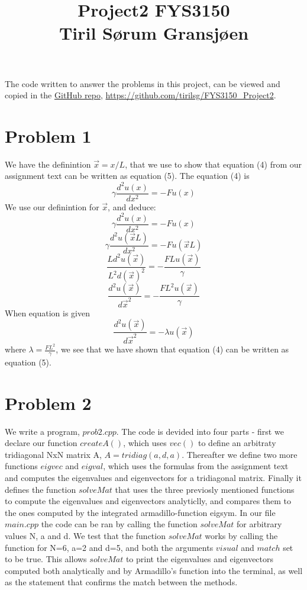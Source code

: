 \documentclass{article} %
\begin{document}
\title{Project2 FYS3150 \\ Tiril Sørum Gransjøen} %
\maketitle
   The code written to answer the problems in this project, 
  can be viewed and copied in the \href{https://github.com/tirilsg/FYS3150_Project2}{GitHub repo}, 
  \url{https://github.com/tirilsg/FYS3150_Project2}. 

  \section{Problem 1} 
  We have the definintion $ \vec{x}=x/L $, that we use to show that equation (4) 
  from our assignment text can be written as equation (5). The equation (4) is 
  \begin{equation}
    \gamma \frac{d^2u(x)}{dx^2}=-Fu(x)\tag{4} 
  \end{equation}
  We use our definintion for $ \vec{x}$, and deduce:
  $$\gamma \frac{d^2u(x)}{dx^2}=-Fu(x) $$ 
  $$\gamma \frac{d^2u(\vec{x}L)}{dx^2}=-Fu(\vec{x}L) $$ 
  $$\frac{Ld^2u(\vec{x})}{L^2 d(\vec{x})^2}=-\frac{FLu(\vec{x})}{\gamma} $$ 
  $$\frac{d^2u(\vec{x})}{d\vec{x}^2}=-\frac{FL^2u(\vec{x})}{\gamma} $$ 
  When equation is given 
  \begin{equation}
  \frac{d^2u(\vec{x})}{d\vec{x}^2}=-\lambda u(\vec{x})\tag{5}
  \end{equation}  
  where $\lambda=\frac{FL^2}{\gamma}$, we see that we have shown that equation (4)
  can be written as equation (5). \\


  
  \section{Problem 2} 
  We write a program, $prob2.cpp$. The code is devided 
  into four parts - first we declare our function $createA()$, which uses $vec()$ to define an arbitraty tridiagonal 
  NxN matrix A, $A=tridiag(a,d,a)$. Thereafter we define two more functions $eigvec$ and $eigval$, which uses the 
  formulas from the assignment text and computes the eigenvalues and eigenvectors for a tridiagonal matrix.
  Finally it defines the function $solveMat$ that uses the three previosly mentioned functions to compute the eigenvalues
  and eigenvectors analyticlly, and compares them to the ones computed by the integrated armadillo-function eigsym. 
  In our file $main.cpp$ the code can be ran by calling the function $solveMat$ for arbitrary values N, a and d. We test
  that the function $solveMat$ works by calling the function for N=6, a=2 and d=5, and both the arguments $visual$ and $match$
  set to be true. This allows $solveMat$ to print the eigenvalues and eigenvectors computed both analytically and by Armadillo's 
  function into the terminal, as well as the statement that confirms the match between the methods. 
\end{document}
